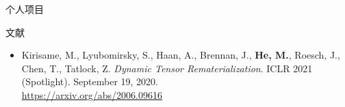\documentclass{resume}
\begin{document}
\begin{rSection}{个人项目}




	\end{rSection}
	\vspace{-5pt}

	\begin{rSection}{文献}
		\begin{itemize}
			\item Kirisame, M., Lyubomirsky, S., Haan, A., Brennan, J., \textbf{He, M.}, Roesch, J., Chen, T., Tatlock, Z. \textit{Dynamic Tensor Rematerialization}. ICLR 2021 (Spotlight). September 19, 2020.\\ \href{https://arxiv.org/abs/2006.09616}{https://arxiv.org/abs/2006.09616}
		\end{itemize}
	\end{rSection}
	
	\vspace{-5pt}
\end{document}

